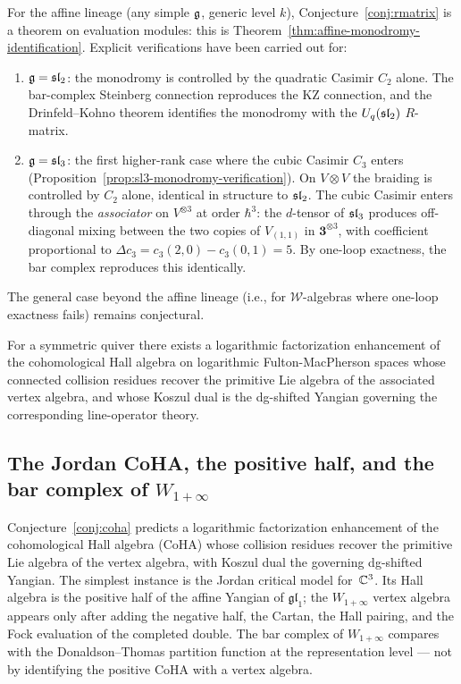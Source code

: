 \begin{remark}
\label{rem:rmatrix-verified-cases}
For the affine lineage (any simple $\mathfrak{g}$, generic level $k$), Conjecture~\ref{conj:rmatrix} is a theorem on evaluation modules: this is Theorem~\ref{thm:affine-monodromy-identification}. Explicit verifications have been carried out for:
\begin{enumerate}[label=\textup{(\alph*)}]
 \item $\mathfrak{g} = \mathfrak{sl}_2$: the monodromy is controlled by the quadratic Casimir $C_2$ alone. The bar-complex Steinberg connection reproduces the KZ connection, and the Drinfeld--Kohno theorem identifies the monodromy with the $U_q(\mathfrak{sl}_2)$ $R$-matrix.
 \item $\mathfrak{g} = \mathfrak{sl}_3$: the first higher-rank case where the cubic Casimir $C_3$ enters \textup{(}Proposition~\textup{\ref{prop:sl3-monodromy-verification})}. On $V \otimes V$ the braiding is controlled by $C_2$ alone, identical in structure to $\mathfrak{sl}_2$. The cubic Casimir enters through the \emph{associator} on $V^{\otimes 3}$ at order $\hbar^3$: the $d$-tensor of $\mathfrak{sl}_3$ produces off-diagonal mixing between the two copies of $V_{(1,1)}$ in $\mathbf{3}^{\otimes 3}$, with coefficient proportional to $\Delta c_3 = c_3(2,0) - c_3(0,1) = 5$. By one-loop exactness, the bar complex reproduces this identically.
\end{enumerate}
The general case beyond the affine lineage (i.e., for $\mathcal{W}$-algebras where one-loop exactness fails) remains conjectural.
\end{remark}

\begin{conjecture}\label{conj:coha}
For a symmetric quiver there exists a logarithmic factorization enhancement of the cohomological Hall algebra on logarithmic Fulton-MacPherson spaces whose connected collision residues recover the primitive Lie algebra of the associated vertex algebra, and whose Koszul dual is the dg-shifted Yangian governing the corresponding line-operator theory.
\end{conjecture}

\subsection{The Jordan CoHA, the positive half, and the bar complex of $W_{1+\infty}$}
\label{subsec:coha-jordan-bar}

Conjecture~\ref{conj:coha} predicts a logarithmic factorization
enhancement of the cohomological Hall algebra (CoHA) whose collision
residues recover the primitive Lie algebra of the vertex algebra, with
Koszul dual the governing dg-shifted Yangian. The simplest instance
is the Jordan critical model for~$\mathbb C^3$. Its Hall algebra is the
positive half of the affine Yangian of $\mathfrak{gl}_1$; the
$W_{1+\infty}$ vertex algebra appears only after adding the negative
half, the Cartan, the Hall pairing, and the Fock evaluation of the
completed double. The bar complex of $W_{1+\infty}$ compares
with the Donaldson--Thomas partition function at the representation
level — not by identifying the positive CoHA with a vertex algebra.

